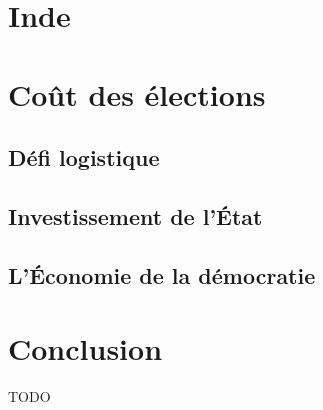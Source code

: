 \documentclass[12pt,a4paper]{report}
\begin{document}
\section{Inde} %

\section{Coût des élections}

\subsection{Défi logistique}
\subsection{Investissement de l'État}
\subsection{L'Économie de la démocratie}


\newpage
\section*{Conclusion}
TODO

 

\end{document}
